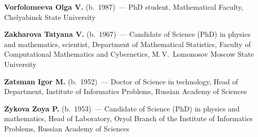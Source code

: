 \begin{multicols}{2}
\vspace*{3pt}

\noindent
\textbf{Vorfolomeeva Olga V.} (b.\ 1987)~--- PhD student, Mathematical Faculty, Chelyabinsk 
State University

\vspace*{3pt}

\noindent
\textbf{Zakharova Tatyana V.} (b.\ 1967)~--- Candidate of Science (PhD) in physics and 
mathematics, scientist, Department of Mathematical Statistics, Faculty of 
Computational Mathematics and Cybernetics, M.\,V.~Lomonosov Moscow State 
University

\vspace*{3pt}

\noindent
\textbf{Zatsman Igor M.} (b.\ 1952)~--- Doctor of Science in technology, Head of Department, 
Institute of Informatics Problems, Russian Academy of Sciences

\vspace*{3pt}

\noindent
\textbf{Zykova Zoya P.} (b.\ 1953)~--- Candidate of Science (PhD) in physics and 
mathematics, Head of Laboratory, Oryol Branch of the Institute of Informatics 
Problems, Russian Academy of Sciences 


\label{end\stat}




\end{multicols}
\newpage